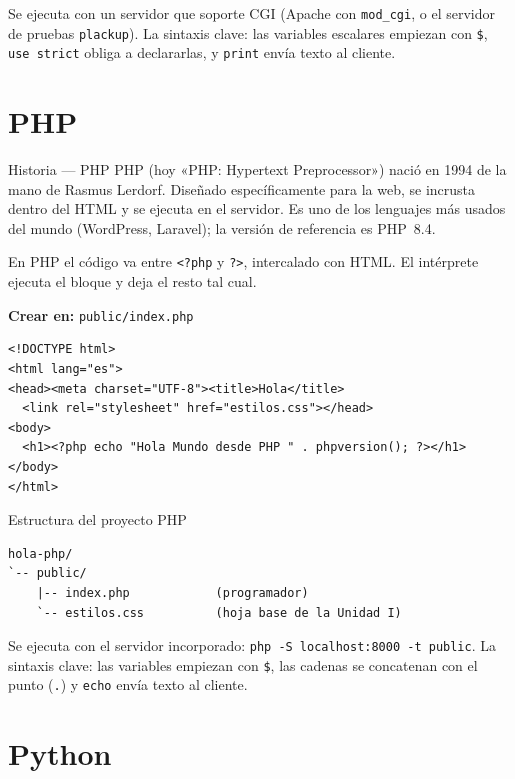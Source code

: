 Se ejecuta con un servidor que soporte CGI (Apache con
\texttt{mod\_cgi}, o el servidor de pruebas \texttt{plackup}). La sintaxis
clave: las variables escalares empiezan con \texttt{\$}, \texttt{use
strict} obliga a declararlas, y \texttt{print} envía texto al cliente.

\section{PHP}
\label{sec:cap5:php}

\begin{cajahistoria}{Historia --- PHP}
PHP (hoy «PHP: Hypertext Preprocessor») nació en 1994 de la mano de
Rasmus Lerdorf. Diseñado específicamente para la web, se incrusta dentro
del HTML y se ejecuta en el servidor. Es uno de los lenguajes más usados
del mundo (WordPress, Laravel); la versión de referencia es PHP~8.4.
\end{cajahistoria}

En PHP el código va entre \texttt{<?php} y \texttt{?>}, intercalado con
HTML. El intérprete ejecuta el bloque y deja el resto tal cual.

{\small\textbf{Crear en:} \texttt{public/index.php}}
\begin{lstlisting}[style=php,caption={index.php --- Hola Mundo en PHP},label={lst:c5-php-hola}]
<!DOCTYPE html>
<html lang="es">
<head><meta charset="UTF-8"><title>Hola</title>
  <link rel="stylesheet" href="estilos.css"></head>
<body>
  <h1><?php echo "Hola Mundo desde PHP " . phpversion(); ?></h1>
</body>
</html>
\end{lstlisting}

\begin{cajaejemplo}{Estructura del proyecto PHP}
\begin{lstlisting}[style=shell,caption={Estructura minima de un proyecto PHP},label={lst:c5-php-tree}]
hola-php/
`-- public/
    |-- index.php            (programador)
    `-- estilos.css          (hoja base de la Unidad I)
\end{lstlisting}
\end{cajaejemplo}

Se ejecuta con el servidor incorporado: \texttt{php -S localhost:8000 -t
public}. La sintaxis clave: las variables empiezan con \texttt{\$}, las
cadenas se concatenan con el punto (\texttt{.}) y \texttt{echo} envía
texto al cliente.

\section{Python}
\label{sec:cap5:python}

